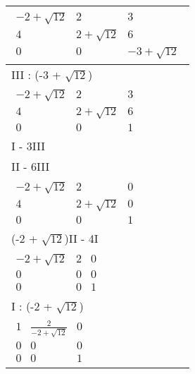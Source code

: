 \begin{longtable}{p{10cm}}
    $\displaystyle\begin{matrix}
                          -2 + \sqrt{12} & 2             & 3              \\
                          4              & 2 + \sqrt{12} & 6              \\
                          0              & 0             & -3 + \sqrt{12}
                      \end{matrix}$                          \\\hline
    III : (-3 + $\sqrt{12}$)                                                               \\\hline\pagebreak[0]
    $\displaystyle\begin{matrix}
                          -2 + \sqrt{12} & 2             & 3 \\
                          4              & 2 + \sqrt{12} & 6 \\
                          0              & 0             & 1
                      \end{matrix}$                                       \\\hline
    I - 3III                                                                               \\\hline\pagebreak[0]
    II - 6III                                                                              \\\hline\pagebreak[0]
    $\displaystyle\begin{matrix}
                          -2 + \sqrt{12} & 2             & 0 \\
                          4              & 2 + \sqrt{12} & 0 \\
                          0              & 0             & 1
                      \end{matrix}$                                       \\\hline
    (-2 + $\sqrt{12}$)II - 4I                                                              \\\hline\pagebreak[0]
    $\displaystyle\begin{matrix}
                          -2 + \sqrt{12} & 2 & 0 \\
                          0              & 0 & 0 \\
                          0              & 0 & 1
                      \end{matrix}$                                                   \\\hline
    I : (-2 + $\sqrt{12}$)                                                                 \\\hline\pagebreak[0]
    $\displaystyle\begin{matrix}
                          1 & \frac{2}{-2 + \sqrt{12}} & 0 \\
                          0 & 0                        & 0 \\
                          0 & 0                        & 1
                      \end{matrix}$                            \\


\end{longtable}
